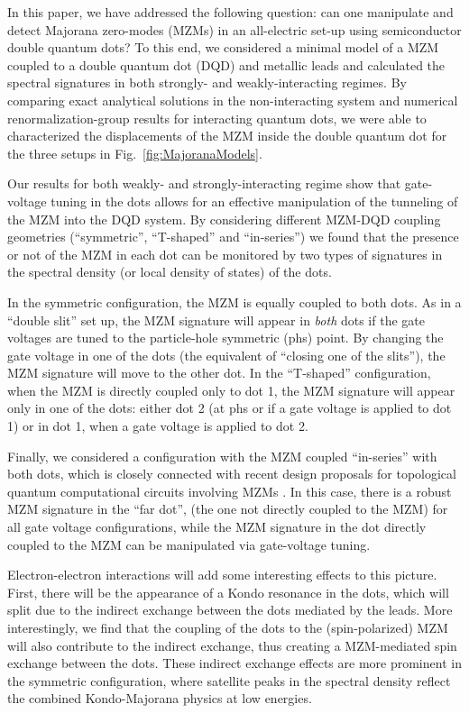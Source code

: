 \documentclass[showpacs,aps,prb,reprint,superscriptaddress]{revtex4-2}
\begin{document}
In this paper, we have addressed the following question: can one manipulate and detect Majorana zero-modes (MZMs) in an all-electric set-up using semiconductor double quantum dots? To this end, we considered a minimal model of a MZM coupled to a double quantum dot (DQD) and metallic leads and calculated the spectral signatures in both strongly- and weakly-interacting regimes. By comparing exact analytical solutions in the non-interacting system and numerical renormalization-group results for interacting quantum dots, we were able to characterized the displacements of the MZM inside the double quantum dot for the three setups in Fig.\ \ref{fig:MajoranaModels}. 

Our results for both weakly- and strongly-interacting regime show that gate-voltage tuning in the dots allows for an effective manipulation of the tunneling of the MZM into the DQD system. By considering different MZM-DQD coupling geometries (``symmetric'', ``T-shaped'' and ``in-series'') we found that the presence or not of the MZM in each dot can be monitored by two types of signatures in the spectral density (or local density of states) of the dots.

In the symmetric configuration, the MZM is equally coupled to both dots. As in a ``double slit'' set up, the MZM signature will appear in \textit{both} dots if the gate voltages are tuned to the particle-hole symmetric (phs) point. By changing the gate voltage in one of the dots (the equivalent of ``closing one of the slits''), the MZM signature will move to the other dot. In the ``T-shaped'' configuration, when the MZM is directly coupled only to dot 1, the MZM signature will appear only in one of the dots: either dot 2 (at phs or if a gate voltage is applied to dot 1) or in dot 1, when a gate voltage is applied to dot 2. 

Finally, we considered a configuration with the MZM coupled ``in-series'' with both dots, which is closely connected with recent design proposals for  topological quantum computational circuits involving MZMs \cite{karzig_scalable_2017}. In this case, there is a robust MZM signature in the ``far dot'', (the one not directly coupled to the MZM) for all gate voltage configurations, while the MZM signature in the dot directly coupled to the MZM can be manipulated via gate-voltage tuning.


Electron-electron interactions will add some interesting effects to this picture. First, there will be the appearance of a Kondo resonance in the dots, which will split due to the indirect exchange between the dots mediated by the leads.  More interestingly, we find that the coupling of the dots to the (spin-polarized) MZM will also contribute to the indirect exchange, thus creating a MZM-mediated spin exchange between the dots.  These indirect exchange effects are more prominent in the symmetric configuration, where satellite peaks in the spectral density reflect the combined Kondo-Majorana physics at low energies. 
\end{document}
